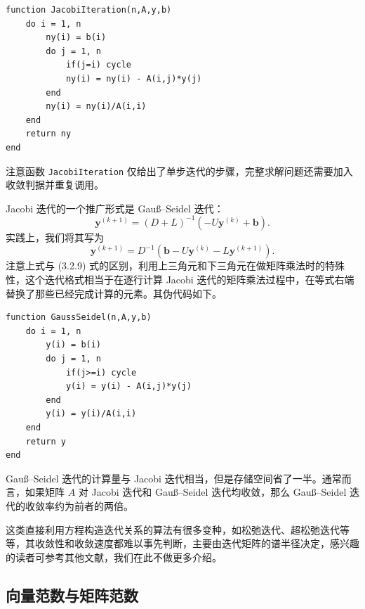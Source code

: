 \begin{algorithmBox}
\begin{lstlisting}[style=bellacode]
function JacobiIteration(n,A,y,b)
    do i = 1, n
        ny(i) = b(i)
        do j = 1, n
            if(j=i) cycle
            ny(i) = ny(i) - A(i,j)*y(j)
        end
        ny(i) = ny(i)/A(i,i)
    end
    return ny
end
\end{lstlisting}
\end{algorithmBox}

注意函数 \texttt{JacobiIteration} 仅给出了单步迭代的步骤，完整求解问题还需要加入收敛判据并重复调用。

Jacobi 迭代的一个推广形式是 Gauß--Seidel 迭代：
\begin{equation}
\bm y^{(k+1)}=(D+L)^{-1}\left(-U\bm y^{(k)}+\bm b\right).
\tag{3.2.10}
\end{equation}
实践上，我们将其写为
\[
\bm y^{(k+1)}=D^{-1}\left(\bm b-U\bm y^{(k)}-L\bm y^{(k+1)}\right).
\]
注意上式与 (3.2.9) 式的区别，利用上三角元和下三角元在做矩阵乘法时的特殊性，这个迭代格式相当于在逐行计算 Jacobi 迭代的矩阵乘法过程中，在等式右端替换了那些已经完成计算的元素。其伪代码如下。

\begin{algorithmBox}
\begin{lstlisting}[style=bellacode]
function GaussSeidel(n,A,y,b)
    do i = 1, n
        y(i) = b(i)
        do j = 1, n
            if(j>=i) cycle
            y(i) = y(i) - A(i,j)*y(j)
        end
        y(i) = y(i)/A(i,i)
    end
    return y
end
\end{lstlisting}
\end{algorithmBox}

Gauß--Seidel 迭代的计算量与 Jacobi 迭代相当，但是存储空间省了一半。通常而言，如果矩阵 $A$ 对 Jacobi 迭代和 Gauß--Seidel 迭代均收敛，那么 Gauß--Seidel 迭代的收敛率约为前者的两倍。

这类直接利用方程构造迭代关系的算法有很多变种，如松弛迭代、超松弛迭代等等，其收敛性和收敛速度都难以事先判断，主要由迭代矩阵的谱半径决定，感兴趣的读者可参考其他文献，我们在此不做更多介绍。

\subsection{向量范数与矩阵范数}

